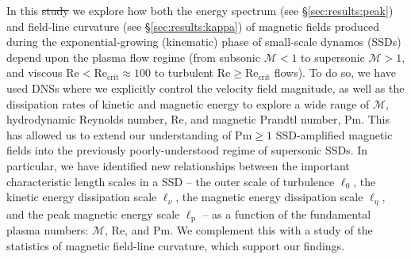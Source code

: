 \documentclass[12pt,twoside]{extreport}
\makeatletter
\newcommand{\mReh}{\ensuremath{\mathrm{Re}}} %
\newcommand{\mPrm}{\ensuremath{\mathrm{Pm}}} %
\newcommand{\mSonicMach}{\ensuremath{\mathcal{M}}} %
\providecommand{\DIFaddtex}[1]{{\protect\color{DIFgreen}\uwave{#1}}} %
\providecommand{\DIFdeltex}[1]{{\protect\color{DIFpurple}\sout{#1}}} %
\providecommand{\DIFaddbegin}{} %
\providecommand{\DIFaddend}{} %
\providecommand{\DIFdelbegin}{} %
\providecommand{\DIFdelend}{} %
\providecommand{\DIFadd}[1]{\texorpdfstring{\DIFaddtex{#1}}{#1}} %
\providecommand{\DIFdel}[1]{\texorpdfstring{\DIFdeltex{#1}}{}} %
\providecommand{\DIFscaledelfig}{0.5}
\newlength{\DIFdelgraphicswidth} %
\newlength{\DIFdelgraphicsheight} %
\providecommand{\DIFaddincludegraphics}[2][]{{\color{DIFgreen}\fbox{\DIFOincludegraphics[#1]{#2}}}} %
\providecommand{\DIFdelincludegraphics}[2][]{%
\sbox{\DIFdelgraphicsbox}{\DIFOincludegraphics[#1]{#2}}%
\settoboxwidth{\DIFdelgraphicswidth}{\DIFdelgraphicsbox} %
\settoboxtotalheight{\DIFdelgraphicsheight}{\DIFdelgraphicsbox} %
\scalebox{\DIFscaledelfig}{%
\parbox[b]{\DIFdelgraphicswidth}{\usebox{\DIFdelgraphicsbox}\\[-\baselineskip] \rule{\DIFdelgraphicswidth}{0em}}\llap{\resizebox{\DIFdelgraphicswidth}{\DIFdelgraphicsheight}{%
\setlength{\unitlength}{\DIFdelgraphicswidth}%
\begin{picture}(1,1)%
\thicklines\linethickness{2pt} %
{\color{DIFpurple}\put(0,0){\framebox(1,1){}}}%
{\color{DIFpurple}\put(0,0){\line( 1,1){1}}}%
{\color{DIFpurple}\put(0,1){\line(1,-1){1}}}%
\end{picture}%
}\hspace*{3pt}}} %
} %
\DeclareRobustCommand{\DIFaddbegin}{\DIFOaddbegin \let\includegraphics\DIFaddincludegraphics} %
\DeclareRobustCommand{\DIFaddend}{\DIFOaddend \let\includegraphics\DIFOincludegraphics} %
\DeclareRobustCommand{\DIFdelbegin}{\DIFOdelbegin \let\includegraphics\DIFdelincludegraphics} %
\DeclareRobustCommand{\DIFdelend}{\DIFOaddend \let\includegraphics\DIFOincludegraphics} %
\let\sout@orig\sout %
\renewcommand{\sout}[1]{\ifmmode\text{\sout@orig{\ensuremath{#1}}}\else\sout@orig{#1}\fi} %
\makeatother
\begin{document}
In this \DIFdelbegin \DIFdel{study }\DIFdelend \DIFaddbegin \DIFadd{chapter }\DIFaddend we explore how both the energy spectrum (see \S\ref{sec:results:peak}) and field-line curvature (see \S\ref{sec:results:kappa}) of magnetic fields produced during the exponential-growing (kinematic) phase of small-scale dynamos (SSDs) depend upon the plasma flow regime (from subsonic $\mSonicMach < 1$ to supersonic $\mSonicMach > 1$, and viscous $\mReh < \mReh_\mathrm{crit} \approx 100$ to turbulent $\mReh \geq \mReh_\mathrm{crit}$ flows). To do so, we have used DNSs where we explicitly control the velocity field magnitude, as well as the dissipation rates of kinetic and magnetic energy to explore a wide range of $\mSonicMach$, hydrodynamic Reynolds number, $\mReh$, and magnetic Prandtl number, $\mPrm$. This has allowed us to extend our understanding of $\mPrm \geq 1$ SSD-amplified magnetic fields into the previously poorly-understood regime of supersonic SSDs. In particular, we have identified new relationships between the important characteristic length scales in a SSD -- the outer scale of turbulence \DIFdelbegin \DIFdel{$\ell_0$}\DIFdelend \DIFaddbegin \DIFadd{$\ell_\mathrm{turb}$}\DIFaddend , the kinetic energy dissipation scale $\ell_\nu$, the magnetic energy dissipation scale $\ell_\eta$, and the peak magnetic energy scale $\ell_\mathrm{p}$ -- as a function of the fundamental plasma numbers: $\mSonicMach$, $\mReh$, and $\mPrm$. We complement this with a study of the statistics of magnetic field-line curvature, which support our findings.
\end{document}
